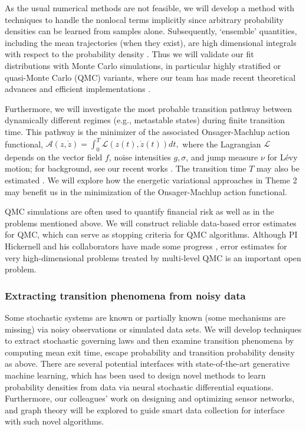 \documentclass[11pt]{NSFamsart}
\begin{document}
As the usual numerical methods  are not feasible, we will develop a method with techniques to handle the nonlocal terms implicitly since arbitrary probability densities can be learned from samples alone. Subsequently, `ensemble' quantities, including the mean trajectories (when they exist), are high dimensional integrals with respect to the probability density \cite{DuanBook2015}.  Thus we will validate our fit distributions with Monte Carlo simulations, in particular highly stratified or quasi-Monte Carlo (QMC) variants, where our team has made recent theoretical advances \cite{Hic17a, HicEtal17a} and efficient implementations \cite{QMCPy2020a,ChoEtal22a}.

Furthermore, we will investigate the most probable transition pathway between dynamically different regimes (e.g., metastable states) during finite transition time. This pathway is the minimizer of the associated Onsager-Machlup action functional, $\mathcal{A}(z, \dot z) = \int_0^T \mathcal{L}(z(t), \dot z(t)) dt,$ where the Lagrangian  $\mathcal{L}$ depends on the vector field $f$, noise intensities $g, \sigma$, and  jump measure $\nu$ for L\'evy motion; for background, see   our recent works \cite{ChaoDuanOM,HuangYF}. The   transition time $T$ may also be estimated \cite{HuangYF2020}. We will explore how the energetic variational approaches in Theme 2 may benefit us in the minimization of the Onsager-Machlup action functional. 

QMC simulations are often used to quantify financial risk as well as in the problems mentioned above.  We will construct reliable data-based error estimates for QMC, which can serve as stopping criteria for QMC algorithms.  Although PI Hickernell and his collaborators have made some progress \cite{HicJim16a,JimHic16a,HicEtal17a,RatHic19a,JagHic22a}, error estimates for very high-dimensional problems treated by multi-level QMC is an important open problem.

\subsubsection*{Extracting transition phenomena from noisy data}
Some   stochastic systems are known or partially known (some mechanisms are missing) via noisy observations or simulated data sets. We will  develop techniques to extract stochastic governing laws \cite{Wei2022AnOC, YangLi2020a, Li2022ExtractingGL, Lu2022LearningTT} and then examine transition phenomena by computing mean exit time, escape probability and transition probability density as above. 
There are several potential interfaces with state-of-the-art generative machine learning, which has been used to design novel methods to learn probability densities from data via neural stochastic differential equations. Furthermore, our colleagues'  work on 
designing and optimizing sensor networks, and graph theory \cite{karwa2016statistical,Calines2008MonitoringSF} will be explored to guide smart data collection for interface with such novel algorithms. 
\end{document}
